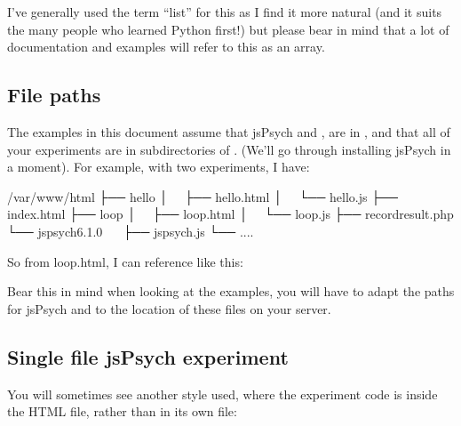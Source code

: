 \documentclass[letterpaper,10pt,english]{sphinxmanual}
\begin{document}
I’ve generally used the term “list” for this as I find it more natural (and it
suits the many people who learned Python first!) but please bear in mind that
a lot of documentation and examples will refer to this as an array.


\subsection{File paths}
\label{\detokenize{jspsych_au:file-paths}}
The examples in this document assume that jsPsych and ,
are in , and that all of your experiments are in
subdirectories of . (We’ll go through installing jsPsych in a
moment). For example, with two experiments, I have:

\begin{sphinxVerbatim}[commandchars=\\\{\}]
/var/www/html
├── hello
│   ├── hello.html
│   └── hello.js
├── index.html
├── loop
│   ├── loop.html
│   └── loop.js
├── record\PYGZus{}result.php
└── jspsych\PYGZhy{}6.1.0
    ├── jspsych.js
    └── ....
\end{sphinxVerbatim}

So from loop.html, I can reference  like this:

\begin{sphinxVerbatim}[commandchars=\\\{\}]
 
\end{sphinxVerbatim}

Bear this in mind when looking at the examples, you will have to adapt the
paths for jsPsych and  to the location of these files
on your server.


\subsection{Single file jsPsych experiment}
\label{\detokenize{jspsych_au:single-file-jspsych-experiment}}
You will sometimes see another style used, where the experiment code is inside
the HTML file, rather than in its own file:
\end{document}
